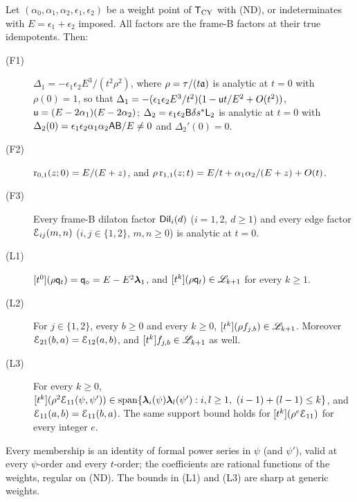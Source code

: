 \begin{thm}
\label{thm:int-leaf}
Let $(\alpha_0,\alpha_1,\alpha_2,\allowbreak\epsilon_1,\epsilon_2)$ be a weight point of $\mathsf{T}_{\mathrm{CY}}$ with (ND), or indeterminates with $E=\epsilon_1+\epsilon_2$ imposed. All factors are the frame-B factors at their true idempotents. Then:
\begin{description}
\item[(F1)] $\Delta_1=-\epsilon_1\epsilon_2E^3/(t^2\rho^2)$, where $\rho=\tau/(t\mathfrak{a})$ is analytic at $t=0$ with $\rho(0)=1$, so that $\Delta_1=-(\epsilon_1\epsilon_2E^3/t^2)(1-\mathsf{u} t/E^2+O(t^2))$, $\mathsf{u}=(E-2\alpha_1)(E-2\alpha_2)$; $\Delta_2=\epsilon_1\epsilon_2\mathsf{B}\delta s^{\ast}\mathsf{L}_2$ is analytic at $t=0$ with $\Delta_2(0)=\epsilon_1\epsilon_2\alpha_1\alpha_2\mathsf{A}\mathsf{B}/E\neq0$ and $\Delta_2'(0)=0$.
\item[(F2)] $\mathrm{r}_{0,1}(z;0)=E/(E+z)$, and $\rho\,\mathrm{r}_{1,1}(z;t)=E/t+\alpha_1\alpha_2/(E+z)+O(t)$.
\item[(F3)] Every frame-B dilaton factor $\mathsf{Dil}_i(d)$ ($i=1,2$, $d\geq1$) and every edge factor $\mathcal{E}_{ij}(m,n)$ ($i,j\in\{1,2\}$, $m,n\geq0$) is analytic at $t=0$.
\item[(L1)] $[t^0](\rho\mathsf{q}_{t})=\mathsf{q}_{\circ}=E-E^2\boldsymbol{\lambda}_1$, and $[t^k](\rho\mathsf{q}_{t})\in\mathscr{L}_{k+1}$ for every $k\geq1$.
\item[(L2)] For $j\in\{1,2\}$, every $b\geq0$ and every $k\geq0$, $[t^k](\rho f_{j,b})\in\mathscr{L}_{k+1}$. Moreover $\mathcal{E}_{21}(b,a)=\mathcal{E}_{12}(a,b)$, and $[t^k]f_{j,b}\in\mathscr{L}_{k+1}$ as well.
\item[(L3)] For every $k\geq0$, $\coef{t^k}(\rho^2\Edge_{11}(\psi,\psi'))\in\mathrm{span}\{\lf_i(\psi)\lf_l(\psi'):i,l\geq1,\ (i-1)+(l-1)\leq k\}$, and $\mathcal{E}_{11}(a,b)=\mathcal{E}_{11}(b,a)$. The same support bound holds for $[t^k](\rho^e\mathcal{E}_{11})$ for every integer $e$.
\end{description}
Every membership is an identity of formal power series in $\psi$ (and $\psi'$), valid at every $\psi$-order and every $t$-order; the coefficients are rational functions of the weights, regular on (ND). The bounds in (L1) and (L3) are sharp at generic weights.
\end{thm}

